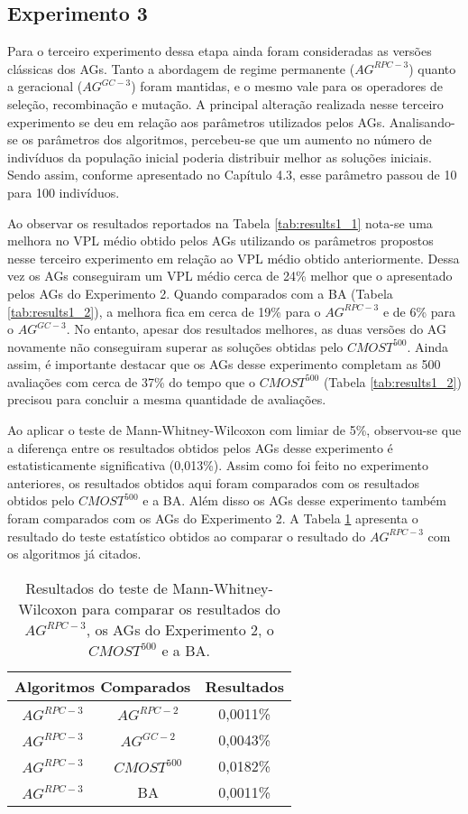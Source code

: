\subsection{Experimento 3}
\label{ch:5_Experimento3}
Para o terceiro experimento dessa etapa ainda foram consideradas as versões clássicas dos AGs. Tanto a abordagem de regime permanente ($AG^{RPC-3}$) quanto a geracional ($AG^{GC-3}$) foram mantidas, e o mesmo vale para os operadores de seleção, recombinação e mutação. A principal alteração realizada nesse terceiro experimento se deu em relação aos parâmetros utilizados pelos AGs. Analisando-se os parâmetros dos algoritmos, percebeu-se que um aumento no número de indivíduos da população inicial poderia distribuir melhor as soluções iniciais. Sendo assim, conforme apresentado no Capítulo 4.3, esse parâmetro passou de 10 para 100 indivíduos.

Ao observar os resultados reportados na Tabela \ref{tab:results1_1} nota-se uma melhora no VPL médio obtido pelos AGs utilizando os parâmetros propostos nesse terceiro experimento em relação ao VPL médio obtido anteriormente. Dessa vez os AGs conseguiram um VPL médio cerca de 24\% melhor que o apresentado pelos AGs do Experimento 2. Quando comparados com a BA (Tabela \ref{tab:results1_2}), a melhora fica em cerca de 19\% para o $AG^{RPC-3}$ e de 6\% para o $AG^{GC-3}$. No entanto, apesar dos resultados melhores, as duas versões do AG novamente não conseguiram superar as soluções obtidas pelo $CMOST^{500}$. Ainda assim, é importante destacar que os AGs desse experimento completam as 500 avaliações com cerca de 37\% do tempo que o $CMOST^{500}$ (Tabela \ref{tab:results1_2}) precisou para concluir a mesma quantidade de avaliações.

Ao aplicar o teste de Mann-Whitney-Wilcoxon com limiar de 5\%, observou-se que a diferença entre os resultados obtidos pelos AGs desse experimento é estatisticamente significativa (0,013\%). Assim como foi feito no experimento anteriores, os resultados obtidos aqui foram comparados com os resultados obtidos pelo $CMOST^{500}$ e a BA. Além disso os AGs desse experimento também foram comparados com os AGs do Experimento 2. A Tabela \ref{tab:mw3_1} apresenta o resultado do teste estatístico obtidos ao comparar o resultado do $AG^{RPC-3}$ com os algoritmos já citados.

\begin{table}[H]
\centering
\caption{Resultados do teste de Mann-Whitney-Wilcoxon para comparar os resultados do $AG^{RPC-3}$, os AGs do Experimento 2, o $CMOST^{500}$ e a BA.}
\label{tab:mw3_1}
\begin{tabular}{|c|c|c|}
\hline
\multicolumn{2}{|c|}{Algoritmos Comparados} & Resultados \\ \hline
$AG^{RPC-3}$ & $AG^{RPC-2}$ & 0,0011\% \\ \hline
$AG^{RPC-3}$ & $AG^{GC-2}$ & 0,0043\% \\ \hline
$AG^{RPC-3}$ & $CMOST^{500}$ & 0,0182\% \\ \hline
$AG^{RPC-3}$ & BA & 0,0011\% \\ \hline

\end{tabular}
\end{table}

